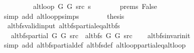 \begin{isabellebody}
\ \ \ \ \isamarkupfalse%
\ \isamarkupfalse%
\ {\isachardoublequoteopen}{\isachardot}{\kern0pt}{\isachardot}{\kern0pt}{\isachardot}{\kern0pt}\ {\isacharequal}{\kern0pt}\ alt{\isacharunderscore}{\kern0pt}loop\ G{}\ G{}\ src\ s{\isachardoublequoteclose}\isanewline
\ \ \ \ \ \ \isamarkupfalse%
\ {\isachardoublequoteopen}{}{\isachardot}{\kern0pt}prems{\isachardoublequoteclose}\ False\isanewline
\ \ \ \ \ \ \isamarkupfalse%
\ {\isacharparenleft}{\kern0pt}simp\ add{\isacharcolon}{\kern0pt}\ alt{\isacharunderscore}{\kern0pt}loop{\isacharunderscore}{\kern0pt}psimps{\isacharparenright}{\kern0pt}\isanewline
\ \ \ \ \isamarkupfalse%
\ \isamarkupfalse%
\ {\isacharquery}{\kern0pt}thesis\isanewline
\ \ \ \ \ \ \isacommand{{\isachardot}{\kern0pt}}\isamarkupfalse%
\isanewline
\ \ \isamarkupfalse%
\isanewline
{}\isamarkupfalse%
%
\endisatagproof
{\isafoldproof}%
%
\isadelimproof
\isanewline
%
\endisadelimproof
\isanewline
{}\isamarkupfalse%
\ {\isacharparenleft}{\kern0pt}\ alt{\isacharunderscore}{\kern0pt}bfs{\isacharunderscore}{\kern0pt}valid{\isacharunderscore}{\kern0pt}input{\isacharparenright}{\kern0pt}\ alt{\isacharunderscore}{\kern0pt}bfs{\isacharunderscore}{\kern0pt}partial{\isacharunderscore}{\kern0pt}eq{\isacharunderscore}{\kern0pt}alt{\isacharunderscore}{\kern0pt}bfs{\isacharcolon}{\kern0pt}\isanewline
\ \ \ {\isachardoublequoteopen}alt{\isacharunderscore}{\kern0pt}bfs{\isacharunderscore}{\kern0pt}partial\ G{}\ G{}\ src\ {\isacharequal}{\kern0pt}\ alt{\isacharunderscore}{\kern0pt}bfs\ G{}\ G{}\ src{\isachardoublequoteclose}\isanewline
%
\isadelimproof
\ \ %
\endisadelimproof
%
\isatagproof
{}\isamarkupfalse%
\ alt{\isacharunderscore}{\kern0pt}bfs{\isacharunderscore}{\kern0pt}invar{\isacharunderscore}{\kern0pt}init\isanewline
\ \ \isamarkupfalse%
\ {\isacharparenleft}{\kern0pt}simp\ add{\isacharcolon}{\kern0pt}\ alt{\isacharunderscore}{\kern0pt}bfs{\isacharunderscore}{\kern0pt}partial{\isacharunderscore}{\kern0pt}def\ alt{\isacharunderscore}{\kern0pt}bfs{\isacharunderscore}{\kern0pt}def\ alt{\isacharunderscore}{\kern0pt}loop{\isacharunderscore}{\kern0pt}partial{\isacharunderscore}{\kern0pt}eq{\isacharunderscore}{\kern0pt}alt{\isacharunderscore}{\kern0pt}loop{\isacharparenright}{\kern0pt}%
\endisatagproof
{\isafoldproof}%
%
\isadelimproof
\isanewline
%
\endisadelimproof
\isanewline

\end{isabellebody}
